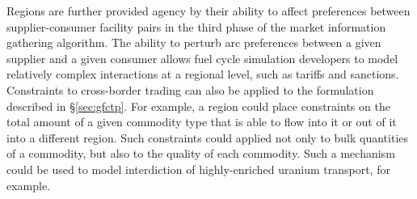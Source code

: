 Regions are further provided agency by their ability to affect preferences
between supplier-consumer facility pairs in the third phase of the market
information gathering algorithm. The ability to perturb arc preferences between
a given supplier and a given consumer allows fuel cycle simulation developers to
model relatively complex interactions at a regional level, such as tariffs and
sanctions. Constraints to cross-border trading can also be applied to the
formulation described in \S\ref{sec:gfctp}. For example, a region could place
constraints on the total amount of a given commodity type that is able to flow
into it or out of it into a different region. Such constraints could applied not
only to bulk quantities of a commodity, but also to the quality of each
commodity. Such a mechanism could be used to model interdiction of
highly-enriched uranium transport, for example.
